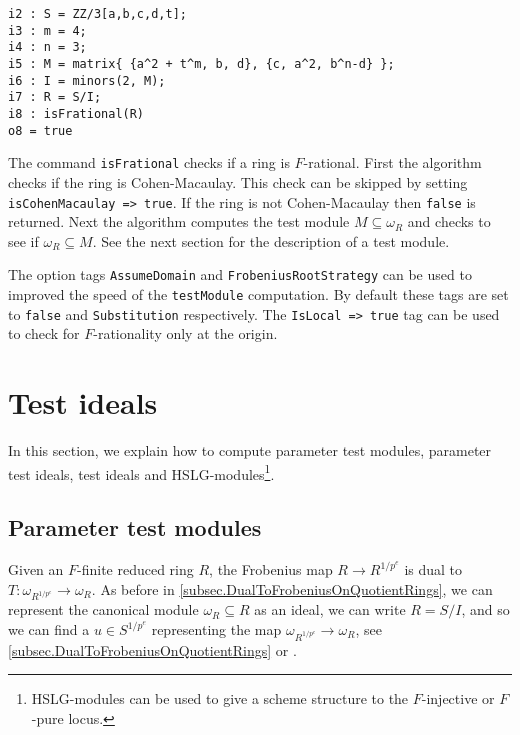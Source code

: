 \documentclass[11pt]{amsart}
\begin{document}
\begin{verbatim}
i2 : S = ZZ/3[a,b,c,d,t];
i3 : m = 4;
i4 : n = 3;
i5 : M = matrix{ {a^2 + t^m, b, d}, {c, a^2, b^n-d} };
i6 : I = minors(2, M);
i7 : R = S/I;
i8 : isFrational(R)
o8 = true
\end{verbatim}


The command \texttt{isFrational} checks if a ring is $F$-rational. First the
algorithm checks if the ring is Cohen-Macaulay.
This check can be skipped by setting \texttt{isCohenMacaulay => true}. If the ring
is not Cohen-Macaulay then \texttt{false} is returned. Next the algorithm
computes the test module $M \subseteq \omega_{R}$ and checks to see if
$\omega_{R} \subseteq M$.  See the next section for the description of a test module.


The option tags \texttt{AssumeDomain} and \texttt{FrobeniusRootStrategy} can be
used to improved the speed of the \texttt{testModule} computation. By default
these tags are set to \texttt{false} and \texttt{Substitution} respectively. The
\texttt{IsLocal => true} tag can be used to check for $F$-rationality only at
the origin.


\section{Test ideals}\label{Section: Test Ideals}

In this section, we explain how to compute parameter test modules, parameter test ideals, test ideals and HSLG-modules\footnote{HSLG-modules can be used to give a scheme structure to the $F$-injective or $F$-pure locus.}.

\subsection{Parameter test modules}

Given an $F$-finite reduced ring $R$, the Frobenius map $R \to R^{1/p^e}$ is dual to $T : \omega_{R^{1/p^e}} \to \omega_R$.  As before in \autoref{subsec.DualToFrobeniusOnQuotientRings}, we can represent the canonical module $\omega_R \subseteq R$ as an ideal, we can write $R = S/I$, and so we can find a $u \in S^{1/p^e}$ representing the map $\omega_{R^{1/p^e}} \to \omega_R$, see \autoref{subsec.DualToFrobeniusOnQuotientRings} or \cite{KatzmanParameterTestIdealOfCMRings}.  
\end{document}
